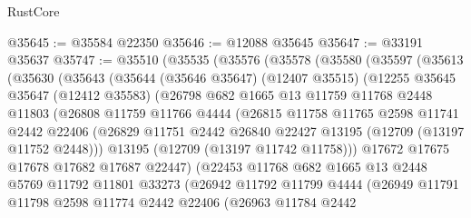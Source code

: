 \begin{lexlean}{RustCore}
\begin{coremodule}
@35645 := @35584 @22350
@35646 := @12088 @35645
@35647 := @33191 @35637
@35747 := @35510
    (@35535
      (@35576
        (@35578
          (@35580
            (@35597
              (@35613
                (@35630
                  (@35643
                    (@35644
                      (@35646 @35647)
                      (@12407 @35515)
                      (@12255
                        @35645
                        @35647
                        (@12412 @35583)
                        (@26798
                          @682
                          @1665
                          @13
                          @11759
                          @11768
                          @2448
                          @11803
                          (@26808
                            @11759
                            @11766
                            @4444
                            (@26815
                              @11758
                              @11765
                              @2598
                              @11741
                              @2442
                              @22406
                              (@26829
                                @11751
                                @2442
                                @26840
                                @22427
                                @13195
                                (@12709 (@13197 @11752 @2448)))
                              @13195
                              (@12709 (@13197 @11742 @11758)))
                            @17672
                            @17675
                            @17678
                            @17682
                            @17687
                            @22447)
                          (@22453
                            @11768
                            @682
                            @1665
                            @13
                            @2448
                            @5769
                            @11792
                            @11801
                            @33273
                            (@26942
                              @11792
                              @11799
                              @4444
                              (@26949
                                @11791
                                @11798
                                @2598
                                @11774
                                @2442
                                @22406
                                (@26963
                                  @11784
                                  @2442

\end{coremodule}
\end{lexlean}
